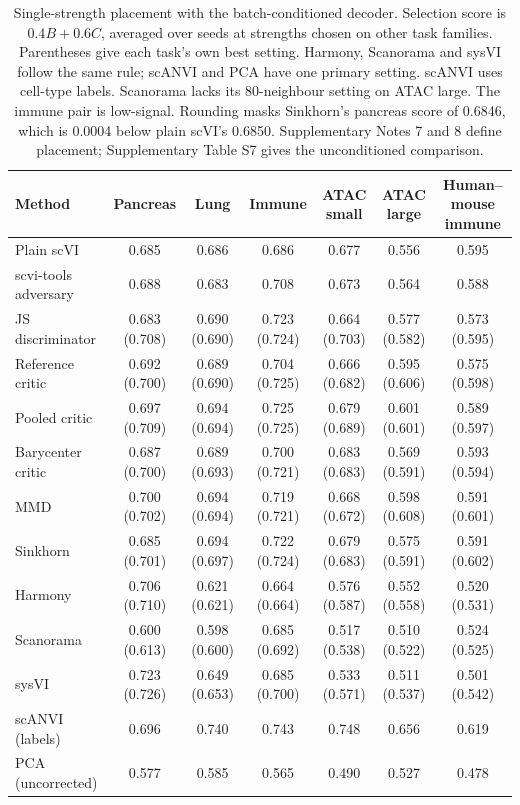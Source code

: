 \begin{table}[t]
\centering\scriptsize\renewcommand{\tablename}{Supplementary Table}\renewcommand{\thetable}{S14}%
\caption{Single-strength placement with the batch-conditioned decoder. Selection score is $0.4B+0.6C$, averaged over seeds at strengths chosen on other task families. Parentheses give each task's own best setting. Harmony, Scanorama and sysVI follow the same rule; scANVI and PCA have one primary setting. scANVI uses cell-type labels. Scanorama lacks its 80-neighbour setting on ATAC large. The immune pair is low-signal. Rounding masks Sinkhorn's pancreas score of 0.6846, which is 0.0004 below plain scVI's 0.6850. Supplementary Notes 7 and 8 define placement; Supplementary Table S7 gives the unconditioned comparison.}
\label{tab:4}
\setlength{\tabcolsep}{3.5pt}
\begin{tabular}{@{}lcccccc@{}}
\toprule
Method & Pancreas & Lung & Immune & ATAC small & ATAC large & Human--mouse immune \\
\midrule
Plain scVI & 0.685 & 0.686 & 0.686 & 0.677 & 0.556 & 0.595 \\
scvi-tools adversary & 0.688 & 0.683 & 0.708 & 0.673 & 0.564 & 0.588 \\
JS discriminator & 0.683 (0.708) & 0.690 (0.690) & 0.723 (0.724) & 0.664 (0.703) & 0.577 (0.582) & 0.573 (0.595) \\
Reference critic & 0.692 (0.700) & 0.689 (0.690) & 0.704 (0.725) & 0.666 (0.682) & 0.595 (0.606) & 0.575 (0.598) \\
Pooled critic & 0.697 (0.709) & 0.694 (0.694) & 0.725 (0.725) & 0.679 (0.689) & 0.601 (0.601) & 0.589 (0.597) \\
Barycenter critic & 0.687 (0.700) & 0.689 (0.693) & 0.700 (0.721) & 0.683 (0.683) & 0.569 (0.591) & 0.593 (0.594) \\
MMD & 0.700 (0.702) & 0.694 (0.694) & 0.719 (0.721) & 0.668 (0.672) & 0.598 (0.608) & 0.591 (0.601) \\
Sinkhorn & 0.685 (0.701) & 0.694 (0.697) & 0.722 (0.724) & 0.679 (0.683) & 0.575 (0.591) & 0.591 (0.602) \\
\midrule
Harmony & 0.706 (0.710) & 0.621 (0.621) & 0.664 (0.664) & 0.576 (0.587) & 0.552 (0.558) & 0.520 (0.531) \\
Scanorama & 0.600 (0.613) & 0.598 (0.600) & 0.685 (0.692) & 0.517 (0.538) & 0.510 (0.522) & 0.524 (0.525) \\
sysVI & 0.723 (0.726) & 0.649 (0.653) & 0.685 (0.700) & 0.533 (0.571) & 0.511 (0.537) & 0.501 (0.542) \\
scANVI (labels) & 0.696 & 0.740 & 0.743 & 0.748 & 0.656 & 0.619 \\
PCA (uncorrected) & 0.577 & 0.585 & 0.565 & 0.490 & 0.527 & 0.478 \\
\bottomrule
\end{tabular}
\end{table}
